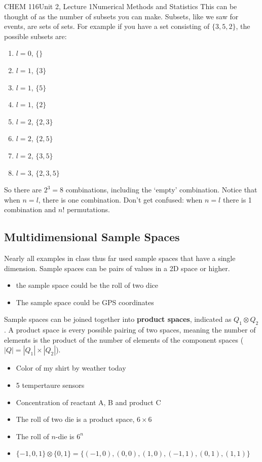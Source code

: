 \documentclass{article}
\begin{document}
\begin{tdoc}{CHEM 116}{Unit 2, Lecture 1}{Numerical Methods and Statistics}
This can be thought of as the number of subsets you can make. Subsets, like we saw for events, are sets of sets. For example if you have a set consisting of $\{3, 5, 2\}$, the possible subsets are:
\begin{enumerate}
\item $l=0$, $\{\}$
\item $l=1$, $\{3\}$
\item $l=1$, $\{5\}$
\item $l=1$, $\{2\}$
\item $l=2$, $\{2, 3\}$
\item $l=2$, $\{2,5\}$
\item $l=2$, $\{3,5\}$
\item $l=3$, $\{2, 3, 5\}$
\end{enumerate}

So there are $2^3 = 8$ combinations, including the `empty' combination. Notice that when $n = l$, there is one combination. Don't get confused: when $n = l$ there is 1 combination and $n!$ permutations.

\subsection{Multidimensional Sample Spaces}

Nearly all examples in class thus far used sample spaces that have a single
dimension. Sample spaces can be pairs of values in a 2D space or
higher.

\begin{itemize}
\item the sample space could be the roll of two dice
\item The sample space could be GPS coordinates
\end{itemize}

Sample spaces can be joined together into {\bf product spaces},
indicated as $Q_1 \otimes Q_2$. A product space is every possible
pairing of two spaces, meaning the number of elements is the product
of the number of elements of the component spaces ($|Q| = |Q_1| \times
|Q_2|$).

\begin{itemize}

\item Color of my shirt by weather today
\item 5 tempertaure sensors
\item Concentration of reactant A, B and product C
\item The roll of two die is a product space, $6\times 6$
\item The roll of $n$-die is $6^n$
\item $\{-1,0,1\} \otimes \{0,1\} = \{(-1,0), (0,0), (1,0), (-1,1), (0,1), (1,1)\}$


\end{itemize}
\end{tdoc}
\end{document}
